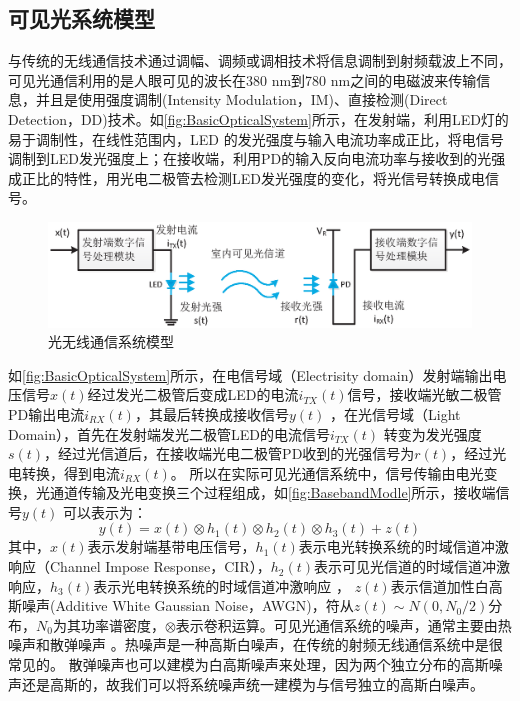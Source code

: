 \subsection{可见光系统模型}
与传统的无线通信技术通过调幅、调频或调相技术将信息调制到射频载波上不同，可见光通信利用的是人眼可见的波长在380 nm到780 nm之间的电磁波来传输信息，并且是使用强度调制(Intensity Modulation，IM)、直接检测(Direct Detection，DD)技术。如\autoref{fig:BasicOpticalSystem}所示，在发射端，利用LED灯的易于调制性，在线性范围内，LED 的发光强度与输入电流功率成正比，将电信号调制到LED发光强度上；在接收端，利用PD的输入反向电流功率与接收到的光强成正比的特性，用光电二极管去检测LED发光强度的变化，将光信号转换成电信号。
\begin{figure}[htbp]
    \centering
    \includegraphics[width=\textwidth]{figures/chapter-2/BasicOpticalSystem.eps}
    \caption{光无线通信系统模型}
    \label{fig:BasicOpticalSystem}
\end{figure}
如\autoref{fig:BasicOpticalSystem}所示，在电信号域（Electrisity domain）发射端输出电压信号$x(t)$经过发光二极管后变成LED的电流$i_{TX}(t)$信号，接收端光敏二极管PD输出电流$i_{RX}(t)$，其最后转换成接收信号$y(t)$ ，在光信号域（Light Domain），首先在发射端发光二极管LED的电流信号$i_{TX}(t)$ 转变为发光强度$s(t)$，经过光信道后，在接收端光电二极管PD收到的光强信号为$r(t)$，经过光电转换，得到电流$i_{RX}(t)$。
所以在实际可见光通信系统中，信号传输由电光变换，光通道传输及光电变换三个过程组成，如\autoref{fig:BasebandModle}所示，接收端信号$y(t)$ 可以表示为：
\begin{equation}
    y(t)=x(t)\otimes h_1(t)\otimes h_2(t)\otimes h_3(t)+z(t)
\end{equation}
其中，$x(t)$表示发射端基带电压信号，$h_1(t)$表示电光转换系统的时域信道冲激响应（Channel Impose Response，CIR），$h_2(t)$表示可见光信道的时域信道冲激响应，$h_3(t)$表示光电转换系统的时域信道冲激响应
\cite{Yangxuecheng2015}，
$z(t)$表示信道加性白高斯噪声(Additive White Gaussian Noise，AWGN)，符从$z(t)\sim N(0,N_0/2)$分布，$N_0$为其功率谱密度，$\otimes$表示卷积运算。可见光通信系统的噪声，通常主要由热噪声和散弹噪声
\cite{Chenchunyan2014}。热噪声是一种高斯白噪声，在传统的射频无线通信系统中是很常见的。
散弹噪声也可以建模为白高斯噪声来处理，因为两个独立分布的高斯噪声还是高斯的，故我们可以将系统噪声统一建模为与信号独立的高斯白噪声。


